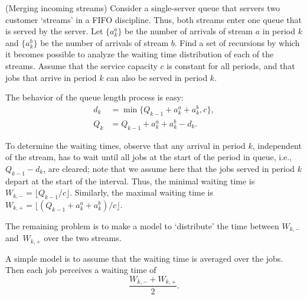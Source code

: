 \begin{exercise} (Merging incoming streams) 
Consider a   single-server queue that servers two customer `streams' in a FIFO
  discipline. Thus, both streams enter one queue that is served by the
  server. Let $\{a_k^a\}$ be the number of arrivals of stream $a$ in
  period $k$ and $\{a_k^b\}$ be the number of arrivals of stream
  $b$. Find a set of recursions by which it becomes possible to
  analyze the waiting time distribution of each of the streams. Assume
  that the service capacity $c$ is constant for all periods, and that
  jobs that arrive in period $k$ can also be served in period $k$.
  \begin{solution}
    The behavior of the queue length  process is easy: 
    \begin{equation*}
      \begin{split}
      d_k &= \min\{Q_{k-1}+a_k^a+a_k^b, c\}, \\
Q_k &= Q_{k-1}+a_k^a + a_k^b - d_k.
      \end{split}
    \end{equation*}

    To determine the waiting times, observe that any arrival in period
    $k$, independent of the stream, has to wait until all jobs at the
    start of the period in queue, i.e., $Q_{k-1}-d_k$, are cleared;
    note that we assume here that the jobs served in period $k$ depart
    at the start of the interval. Thus, the minimal waiting time is
    $W_{k,-} = \lfloor Q_{k-1}/c\rfloor$.  Similarly, the maximal
    waiting time is
    $W_{k,+} = \lfloor (Q_{k-1}+a_k^a + a_k^b) /c\rfloor$.

    The remaining problem is to make a model to `distribute' the
    time between $W_{k,-}$ and~$W_{k,+}$ over the two streams. 

    A simple model is to assume that the waiting time is averaged over
    the jobs. Then each job perceives a waiting time of
    \begin{equation*}
      \frac{W_{k,-} + W_{k,+}}2.
    \end{equation*}


\end{solution}
\end{exercise}
